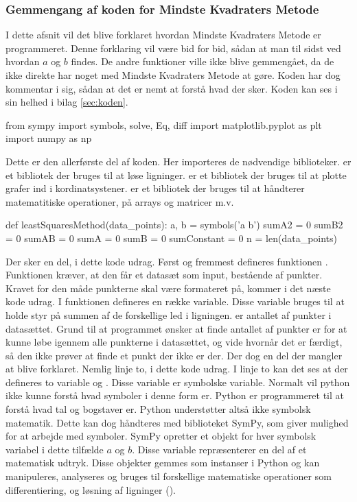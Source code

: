 \subsubsection{Gemmengang af koden for Mindste Kvadraters Metode}
I dette afsnit vil det blive forklaret hvordan Mindste Kvadraters Metode er programmeret. Denne forklaring vil være bid for bid, sådan at man til sidst ved hvordan $a$ og $b$ findes. De andre funktioner ville ikke blive gemmengået, da de ikke direkte har noget med Mindste Kvadraters Metode at gøre. Koden har dog kommentar i sig, sådan at det er nemt at forstå hvad der sker. Koden kan ses i sin helhed i bilag \ref{sec:koden}.
\begin{python}
    from sympy import symbols, solve, Eq, diff
    import matplotlib.pyplot as plt
    import numpy as np 
\end{python}
Dette er den allerførste del af koden. Her importeres de nødvendige biblioteker.  er et bibliotek der bruges til at løse ligninger.  er et bibliotek der bruges til at plotte grafer ind i kordinatsystener.  er et bibliotek der bruges til at håndterer matematitiske operationer, på arrays og matricer m.v. 
\begin{python}
    def leastSquaresMethod(data_points):
        a, b = symbols('a b')
        sumA2 = 0
        sumB2 = 0
        sumAB = 0
        sumA = 0
        sumB = 0 
        sumConstant = 0
        n = len(data_points)
\end{python}
Der sker en del, i dette kode udrag. Først og fremmest defineres funktionen . Funktionen kræver, at den får et datasæt som input, bestående af punkter. Kravet for den måde punkterne skal være formateret på, kommer i det næste kode udrag. I funktionen defineres en række variable. Disse variable bruges til at holde styr på summen af de forskellige led i ligningen.  er antallet af punkter i datasættet. Grund til at programmet ønsker at finde antallet af punkter er for at kunne løbe igennem alle punkterne i datasættet, og vide hvornår det er færdigt, så den ikke prøver at finde et punkt der ikke er der. Der dog en del der mangler at blive forklaret. Nemlig linje to, i dette kode udrag. I linje to kan det ses at der defineres to variable  og . Disse variable er symbolske variable. Normalt vil python ikke kunne forstå hvad symboler i denne form er. Python er programmeret til at forstå hvad tal og bogstaver er. Python understøtter altså ikke symbolsk matematik. Dette kan dog håndteres med biblioteket SymPy, som giver mulighed for at arbejde med symboler. SymPy opretter et objekt for hver symbolsk variabel i dette tilfælde $a$ og $b$. Disse variable repræsenterer en del af et matematisk udtryk. Disse objekter gemmes som instanser i Python og kan manipuleres, analyseres og bruges til forskellige matematiske operationer som differentiering, og løsning af ligninger (\cite{matematiskeSymboler}).
